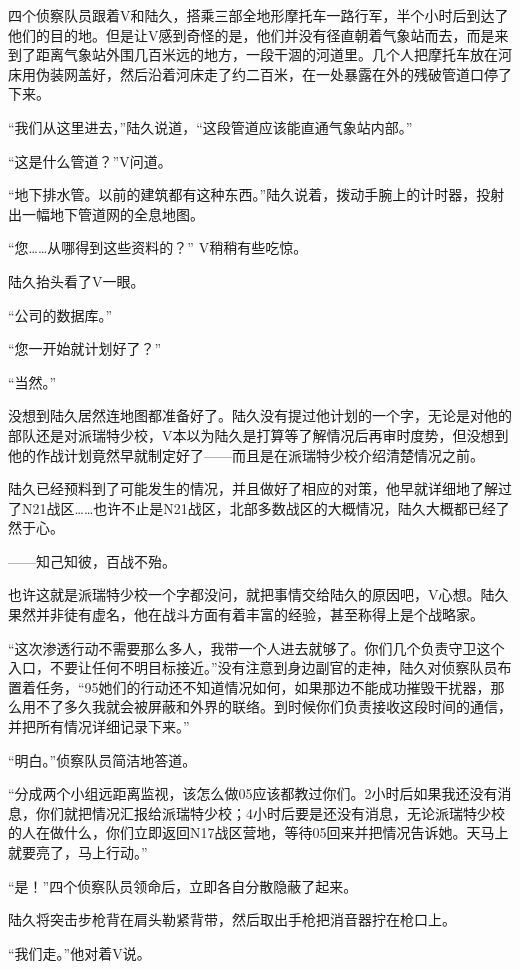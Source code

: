 四个侦察队员跟着V和陆久，搭乘三部全地形摩托车一路行军，半个小时后到达了他们的目的地。但是让V感到奇怪的是，他们并没有径直朝着气象站而去，而是来到了距离气象站外围几百米远的地方，一段干涸的河道里。几个人把摩托车放在河床用伪装网盖好，然后沿着河床走了约二百米，在一处暴露在外的残破管道口停了下来。

“我们从这里进去，”陆久说道，“这段管道应该能直通气象站内部。”

“这是什么管道？”V问道。

“地下排水管。以前的建筑都有这种东西。”陆久说着，拨动手腕上的计时器，投射出一幅地下管道网的全息地图。

“您……从哪得到这些资料的？” V稍稍有些吃惊。

陆久抬头看了V一眼。

“公司的数据库。”

“您一开始就计划好了？”

“当然。”

没想到陆久居然连地图都准备好了。陆久没有提过他计划的一个字，无论是对他的部队还是对派瑞特少校，V本以为陆久是打算等了解情况后再审时度势，但没想到他的作战计划竟然早就制定好了——而且是在派瑞特少校介绍清楚情况之前。

陆久已经预料到了可能发生的情况，并且做好了相应的对策，他早就详细地了解过了N21战区……也许不止是N21战区，北部多数战区的大概情况，陆久大概都已经了然于心。

——知己知彼，百战不殆。

也许这就是派瑞特少校一个字都没问，就把事情交给陆久的原因吧，V心想。陆久果然并非徒有虚名，他在战斗方面有着丰富的经验，甚至称得上是个战略家。

“这次渗透行动不需要那么多人，我带一个人进去就够了。你们几个负责守卫这个入口，不要让任何不明目标接近。”没有注意到身边副官的走神，陆久对侦察队员布置着任务，“95她们的行动还不知道情况如何，如果那边不能成功摧毁干扰器，那么用不了多久我就会被屏蔽和外界的联络。到时候你们负责接收这段时间的通信，并把所有情况详细记录下来。”

“明白。”侦察队员简洁地答道。

“分成两个小组远距离监视，该怎么做05应该都教过你们。2小时后如果我还没有消息，你们就把情况汇报给派瑞特少校；4小时后要是还没有消息，无论派瑞特少校的人在做什么，你们立即返回N17战区营地，等待05回来并把情况告诉她。天马上就要亮了，马上行动。”

“是！”四个侦察队员领命后，立即各自分散隐蔽了起来。

陆久将突击步枪背在肩头勒紧背带，然后取出手枪把消音器拧在枪口上。

“我们走。”他对着V说。

